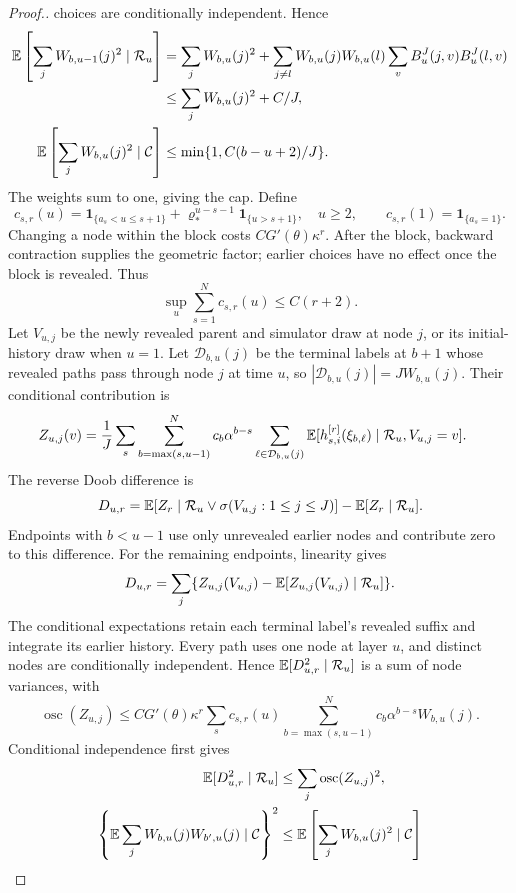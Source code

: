 \documentclass[11pt]{article}
\theoremstyle{thmstylethree}%
\begin{document}
\begin{proof}[Proof.]
{choices are conditionally independent. Hence
\begin{align}
\mathbb{E}\left[\sum_jW_{b,u-1}(j)^2\mid\mathcal R_u\right]
&=\sum_jW_{b,u}(j)^2
 +\sum_{j\ne l}W_{b,u}(j)W_{b,u}(l)
       \sum_vB_u^J(j,v)B_u^J(l,v)\notag\\
&\leq\sum_jW_{b,u}(j)^2+C/J,\notag\\
\mathbb{E}\left[\sum_jW_{b,u}(j)^2\mid\mathcal C\right]
&\leq\min\{1,C(b-u+2)/J\}.
\label{eq:logfree-descendants}
\end{align}
The weights sum to one, giving the cap. Define
\[
c_{s,r}(u)=\mathbf1_{\{a_s<u\leq s+1\}}
 +\varrho_*^{u-s-1}\mathbf1_{\{u>s+1\}},\quad u\geq2,
\qquad c_{s,r}(1)=\mathbf1_{\{a_s=1\}}.
\]
Changing a node within the block costs $CG'(\theta)\kappa^r$.
After the block, backward contraction supplies the geometric factor;
earlier choices have no effect once the block is revealed. Thus
\[
\sup_u\sum_{s=1}^N c_{s,r}(u)\leq C(r+2).
\]
Let $V_{u,j}$ be the newly revealed parent and simulator draw at node
$j$, or its initial-history draw when $u=1$. Let
$\mathcal D_{b,u}(j)$ be the terminal labels at $b+1$ whose revealed
paths pass through node $j$ at time $u$, so
$|\mathcal D_{b,u}(j)|=JW_{b,u}(j)$. Their conditional contribution is
\begin{align}
Z_{u,j}(v)
&=\frac1J\sum_s\sum_{b=\max(s,u-1)}^N c_b\alpha^{b-s}
 \sum_{\ell\in\mathcal D_{b,u}(j)}
 \mathbb{E}[h_{s,i}^{[r]}(\xi_{b,\ell})\mid\mathcal R_u,V_{u,j}=v].
\end{align}
The reverse Doob difference is
\[
D_{u,r}=\mathbb{E}[Z_r\mid\mathcal R_u\vee\sigma(V_{u,j}:1\leq j\leq J)]
       -\mathbb{E}[Z_r\mid\mathcal R_u].
\]
Endpoints with $b<u-1$ use only unrevealed earlier nodes and contribute
zero to this difference. For the remaining endpoints, linearity gives
\[
D_{u,r}=\sum_j\{Z_{u,j}(V_{u,j})-
                    \mathbb{E}[Z_{u,j}(V_{u,j})\mid\mathcal R_u]\}.
\]
The conditional expectations retain each terminal label's revealed
suffix and integrate its earlier history. Every path uses one node at
layer $u$, and distinct nodes are conditionally independent. Hence
$\mathbb{E}[D_{u,r}^2\mid\mathcal R_u]$ is a sum of node variances, with
\[
\operatorname{osc}(Z_{u,j})\leq CG'(\theta)\kappa^r
 \sum_s c_{s,r}(u)\sum_{b=\max(s,u-1)}^N
        c_b\alpha^{b-s}W_{b,u}(j).
\]
Conditional independence first gives
\begin{align*}
\E[D_{u,r}^2\mid\mathcal R_u]
&\leq\sum_j\operatorname{osc}(Z_{u,j})^2,\\
\left\{\E\sum_jW_{b,u}(j)W_{b',u}(j)\mid\mathcal C\right\}^2
&\leq\E\left[\sum_jW_{b,u}(j)^2\mid\mathcal C\right]

\end{align*}}
\end{proof}
\end{document}
